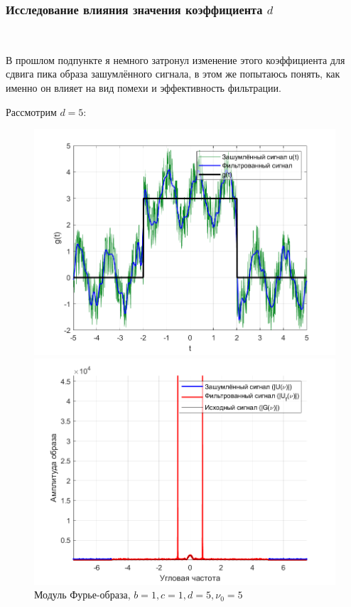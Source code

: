 \documentclass[a4paper]{article}
\begin{document}
\subsubsection{Исследование влияния значения коэффициента $d$}\

В прошлом подпункте я немного затронул изменение этого коэффициента для сдвига пика образа зашумлённого сигнала, в этом же попытаюсь понять, как именно он влияет на вид помехи и эффективность фильтрации.\ 

Рассмотрим $d = 5$:

\begin{figure}[H]
    \begin{minipage}{0.5\textwidth}
        \centering
        \includegraphics[width=\textwidth]{part2/1_1_5.png}
        \caption{$b = 1, c = 1, d = 5, \nu_0 = 5$}
    \end{minipage}    
    \begin{minipage}{0.5\textwidth}
        \centering
        \includegraphics[width=\textwidth]{part2/1_1_5_Fourier.png}
        \caption{Модуль Фурье-образа, $b = 1, c = 1, d = 5, \nu_0 = 5$}
    \end{minipage}
\end{figure}\
\end{document}
